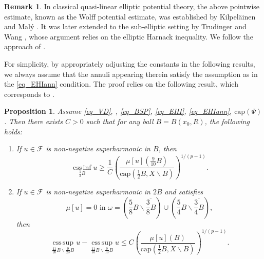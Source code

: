 \documentclass[11pt,a4paper]{article}
\numberwithin{equation}{section}
\newcommand{\esup}{\operatorname*{ess\,sup}}
\newcommand{\einf}{\operatorname*{ess\,inf}}
\theoremstyle{plain}
\newtheorem{proposition}[theorem]{Proposition}
\theoremstyle{definition}
\newtheorem{remark}[theorem]{Remark}
\begin{document}
\begin{remark}
In classical quasi-linear elliptic potential theory, the above pointwise estimate, known as the Wolff potential estimate, was established by Kilpel\"ainen and Mal\'y \cite{KM92Pisa,KM94Acta}. It was later extended to the sub-elliptic setting by Trudinger and Wang \cite{TW02AJM}, whose argument relies on the elliptic Harnack inequality. We follow the approach of \cite{TW02AJM}.
\end{remark}


For simplicity, by appropriately adjusting the constants in the following results, we always assume that the annuli appearing therein satisfy the assumption as in the \ref{eq_EHIann} condition. The proof relies on the following result, which corresponds to \cite[LEMMA 5.1]{TW02AJM}.

\begin{proposition}\label{prop_Wolff}
Assume \ref{eq_VD}, \hyperlink{eq_LSC}{}, \ref{eq_BSP}, \ref{eq_EHI}, \ref{eq_EHIann}, \hyperlink{eq_cap}{$\text{cap}(\Psi)$}. Then there exists $C>0$ such that for any ball $B=B(x_0,R)$, the following holds:
\begin{enumerate}[label=(\alph*),ref=(\alph*)]
\item\label{item_Wolff1} If $u\in\mathcal{F}$ is non-negative superharmonic in $B$, then
\begin{equation}\label{eq_Wolff1}
\einf_{\frac{1}{2}B}u\ge \frac{1}{C}\left(\frac{\mu[u]\left(\frac{9}{10}B\right)}{\mathrm{cap}\left(\frac{1}{2}B,X\backslash B\right)}\right)^{1/(p-1)}.
\end{equation}
\item\label{item_Wolff2} If $u\in \mathcal{F}$ is non-negative superharmonic in $2B$ and satisfies
$$\mu[u]=0\text{ in }\omega=\left(\frac{5}{8}B\backslash\overline{\frac{3}{8}B}\right)\cup \left(\frac{5}{4}B\backslash \overline{\frac{3}{4}B}\right),$$
then
\begin{equation}\label{eq_Wolff2}
\esup_{\frac{11}{20}B\backslash {\frac{9}{20}B}}u-\esup_{\frac{11}{10}B\backslash {\frac{9}{10}B}}u\le C\left(\frac{\mu[u](B)}{\mathrm{cap}\left(\frac{1}{2}B,X\backslash B\right)}\right)^{1/(p-1)}.
\end{equation}
\end{enumerate}
\end{proposition}
\end{document}
